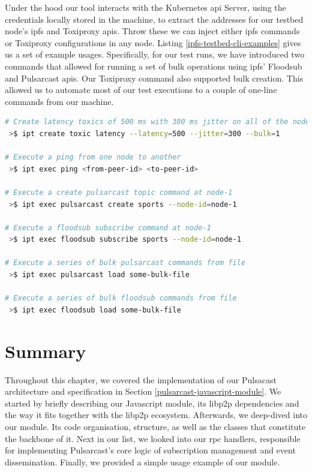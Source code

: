 Under the hood our tool interacts with the Kubernetes \acrshort{api} Server,
using the credentials locally stored in the machine, to extract the addresses
for our testbed node's \acrshort{ipfs} and Toxiproxy \acrshort{api}s. Throw
these we can inject either \acrshort{ipfs} commands or Toxiproxy configurations
in any node. Listing \ref{ipfs-testbed-cli-examples} gives us a set of example
usages. Specifically, for our test runs, we have introduced two commands that
allowed for running a set of bulk operations using \acrshort{ipfs}' Floodsub
and Pulsarcast \acrshort{api}s.  Our Toxiproxy command also supported bulk
creation. This allowed us to automate most of our test executions to a couple
of one-line commands from our machine.

\begin{lstlisting}[language=bash, float, caption={\acrshort{ipfs} Testbed \acrshort{cli} example
usages},label={ipfs-testbed-cli-examples}]
# Create latency toxics of 500 ms with 300 ms jitter on all of the nodes (bulk=1)
 >$ ipt create toxic latency --latency=500 --jitter=300 --bulk=1

# Execute a ping from one node to another
 >$ ipt exec ping <from-peer-id> <to-peer-id>

# Execute a create pulsarcast topic command at node-1
 >$ ipt exec pulsarcast create sports --node-id=node-1

# Execute a floodsub subscribe command at node-1
 >$ ipt exec floodsub subscribe sports --node-id=node-1

# Execute a series of bulk pulsarcast commands from file
 >$ ipt exec pulsarcast load some-bulk-file

# Execute a series of bulk floodsub commands from file
 >$ ipt exec floodsub load some-bulk-file

\end{lstlisting}

\section{Summary}\label{summary}

Throughout this chapter, we covered the implementation of our Pulsacast
architecture and specification in Section \ref{pulsarcast-javascript-module}.
We started by briefly describing our Javascript module, its libp2p dependencies
and the way it fits together with the libp2p ecosystem. Afterwards, we
deep-dived into our module. Its code organisation, structure, as well as the
classes that constitute the backbone of it. Next in our list, we looked into
our \acrshort{rpc} handlers, responsible for implementing Pulsarcast's core
logic of subscription management and event dissemination.  Finally, we provided
a simple usage example of our module.

